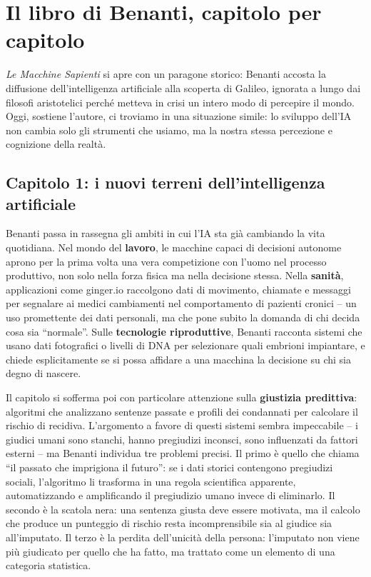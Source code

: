 \documentclass[a4paper,11pt]{article}
\begin{document}
\section{Il libro di Benanti, capitolo per capitolo}

\emph{Le Macchine Sapienti} si apre con un paragone storico: Benanti accosta la diffusione dell'intelligenza artificiale alla scoperta di Galileo, ignorata a lungo dai filosofi aristotelici perché metteva in crisi un intero modo di percepire il mondo. Oggi, sostiene l'autore, ci troviamo in una situazione simile: lo sviluppo dell'IA non cambia solo gli strumenti che usiamo, ma la nostra stessa percezione e cognizione della realtà.

\subsection{Capitolo 1: i nuovi terreni dell'intelligenza artificiale}

Benanti passa in rassegna gli ambiti in cui l'IA sta già cambiando la vita quotidiana. Nel mondo del \textbf{lavoro}, le macchine capaci di decisioni autonome aprono per la prima volta una vera competizione con l'uomo nel processo produttivo, non solo nella forza fisica ma nella decisione stessa. Nella \textbf{sanità}, applicazioni come ginger.io raccolgono dati di movimento, chiamate e messaggi per segnalare ai medici cambiamenti nel comportamento di pazienti cronici -- un uso promettente dei dati personali, ma che pone subito la domanda di chi decida cosa sia ``normale''. Sulle \textbf{tecnologie riproduttive}, Benanti racconta sistemi che usano dati fotografici o livelli di DNA per selezionare quali embrioni impiantare, e chiede esplicitamente se si possa affidare a una macchina la decisione su chi sia degno di nascere.

Il capitolo si sofferma poi con particolare attenzione sulla \textbf{giustizia predittiva}: algoritmi che analizzano sentenze passate e profili dei condannati per calcolare il rischio di recidiva. L'argomento a favore di questi sistemi sembra impeccabile -- i giudici umani sono stanchi, hanno pregiudizi inconsci, sono influenzati da fattori esterni -- ma Benanti individua tre problemi precisi. Il primo è quello che chiama ``il passato che imprigiona il futuro'': se i dati storici contengono pregiudizi sociali, l'algoritmo li trasforma in una regola scientifica apparente, automatizzando e amplificando il pregiudizio umano invece di eliminarlo. Il secondo è la scatola nera: una sentenza giusta deve essere motivata, ma il calcolo che produce un punteggio di rischio resta incomprensibile sia al giudice sia all'imputato. Il terzo è la perdita dell'unicità della persona: l'imputato non viene più giudicato per quello che ha fatto, ma trattato come un elemento di una categoria statistica.
\end{document}
